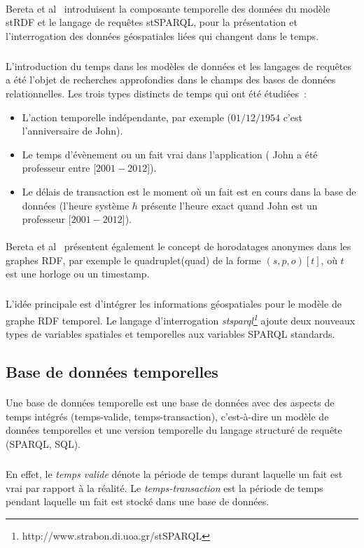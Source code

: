 \documentclass[12pt,a4]{report}
\begin{document}
\paragraph{}
Bereta et al~\cite{bereta2013} introduisent la composante temporelle des données du modèle stRDF et le langage de requêtes stSPARQL, pour la présentation et l’interrogation des données géospatiales liées qui changent dans le temps.
\subparagraph{}
L’introduction du temps dans les modèles de données et les langages de requêtes a été l’objet de recherches approfondies dans le champs des bases de données relationnelles.
\newline
Les trois types distincts de temps qui ont été étudiées~:
\begin{itemize}
\item L'action temporelle indépendante, par exemple ($01/12/1954$ c’est l’anniversaire de John).
\item Le temps d’évènement ou un fait vrai dans l’application ( John a été professeur entre [$2001-2012$]).
\item Le délais de transaction est le moment où un fait est en cours dans la base de données (l’heure système $h$ présente l’heure exact quand John est un professeur [$2001-2012$]).
\end{itemize}
\paragraph{}
Bereta et al~\cite{bereta2013} présentent également le concept de horodatages anonymes dans les graphes RDF, par exemple le quadruplet(quad) de la forme $(s, p, o)[t]$, où $t$ est une horloge ou un timestamp.
\subparagraph{}
L’idée principale est d’intégrer les informations géospatiales pour le modèle de graphe RDF temporel. Le langage d’interrogation{ \it \gls{stsparql}\footnote{http://www.strabon.di.uoa.gr/stSPARQL}} ajoute deux nouveaux types de variables spatiales et temporelles aux variables SPARQL standards.
\subsection{Base de données temporelles}
\paragraph{}
Une base de données temporelle est une base de données avec des aspects de temps intégrés (temps-valide, temps-transaction), c'est-à-dire un modèle de données temporelles et une version temporelle du langage structuré de requête (SPARQL, SQL).
\subparagraph{}
En effet, le \textit{temps valide} dénote la période de temps durant laquelle un fait est vrai par rapport à la réalité.
Le \textit{temps-transaction} est la période de temps pendant laquelle un fait est stocké dans une base de données.
\end{document}
